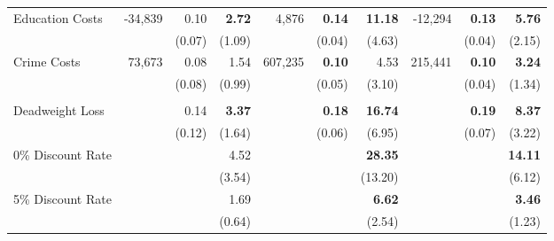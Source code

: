 \begin{tabular}{l r r r r r r r r r}
Education Costs	&	-34,839	&	0.10	&	\textbf{2.72}	&	4,876	&	\textbf{0.14}	&	\textbf{11.18}	&	-12,294	&	\textbf{0.13}	&	\textbf{5.76}	\\	
	&		&	(0.07)	&	(1.09)	&		&	(0.04)	&	(4.63)	&		&	(0.04)	&	(2.15)	\\	
Crime Costs	&	73,673	&	0.08	&	1.54	&	607,235	&	\textbf{0.10}	&	4.53	&	215,441	&	\textbf{0.10}	&	\textbf{3.24}	\\	
	&		&	(0.08)	&	(0.99)	&		&	(0.05)	&	(3.10)	&		&	(0.04)	&	(1.34)	\\ \\	
Deadweight Loss	&		&	0.14	&	\textbf{3.37}	&		&	\textbf{0.18}	&	\textbf{16.74}	&		&	\textbf{0.19}	&	\textbf{8.37}	\\	
	&		&	(0.12)	&	(1.64)	&		&	(0.06)	&	(6.95)	&		&	(0.07)	&	(3.22)	\\	
0\% Discount Rate	&		&		&	4.52	&		&		&	\textbf{28.35}	&		&		&	\textbf{14.11}	\\	
	&		&		&	(3.54)	&		&		&	(13.20)	&		&		&	(6.12)	\\	
5\% Discount Rate	&		&		&	1.69	&		&		&	\textbf{6.62}	&		&		&	\textbf{3.46}	\\	
	&		&		&	(0.64)	&		&		&	(2.54)	&		&		&	(1.23)	\\	
\bottomrule																				
\end{tabular}																				
